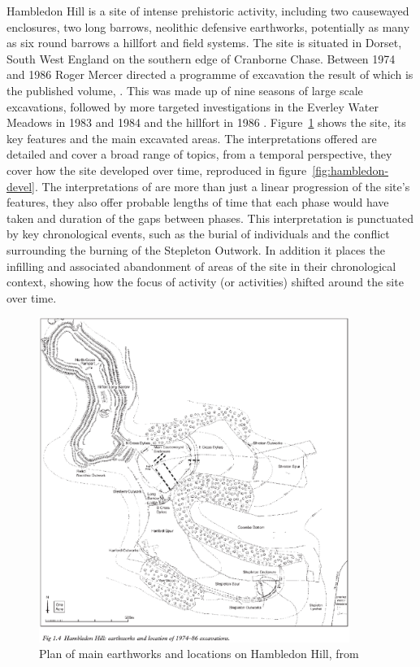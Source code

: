 Hambledon Hill is a site of intense prehistoric activity, including two causewayed enclosures, two long barrows, neolithic defensive earthworks, \citep[xiii]{Mercer:2008fk} potentially as many as six round barrows \citep[12]{Mercer:2008fk} a hillfort and field systems. The site is situated in Dorset, South West England on the southern edge of Cranborne Chase. Between 1974 and 1986 Roger Mercer directed a programme of excavation the result of which is the published volume, \citet{Mercer:2008fk}. This was made up of nine seasons of large scale excavations, followed by more targeted investigations in the Everley Water Meadows in 1983 and 1984 and the hillfort in 1986 \citep[11]{Mercer:2008fk}. Figure~\ref{fig:excavations} shows the site, its key features and the main excavated areas. The interpretations offered are detailed and cover a broad range of topics, from a temporal perspective, they cover how the site developed over time, reproduced in figure~\ref{fig:hambledon-devel}. The interpretations of \citep{Whittle:2011kl} are more than just a linear progression of the site's features, they also offer probable lengths of time that each phase would have taken and duration of the gaps between phases. This interpretation is punctuated by key chronological events, such as the burial of individuals and the conflict surrounding the burning of the Stepleton Outwork. In addition it places the infilling and associated abandonment of areas of the site in their chronological context, showing how the focus of activity (or activities) shifted around the site over time. 

\begin{figure}
\begin{center}
	\includegraphics[width=0.9\textwidth]{figures/excavation-plan}
\end{center}
  \caption{Plan of main earthworks and locations on Hambledon Hill, from \citep[5]{Mercer:2008fk}}
  \label{fig:excavations}
\end{figure}

